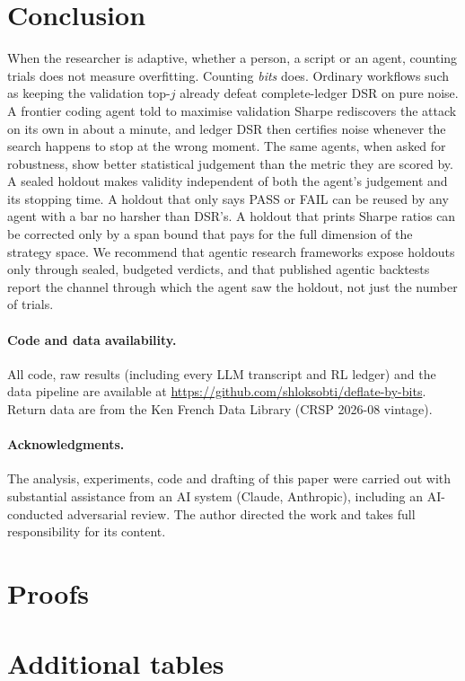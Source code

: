 \documentclass[11pt]{article}
\theoremstyle{definition}
\theoremstyle{remark}
\begin{document}
\section{Conclusion}
When the researcher is adaptive, whether a person, a script or an agent, counting trials does not measure overfitting. Counting \emph{bits} does. Ordinary workflows such as keeping the validation top-$j$ already defeat complete-ledger DSR on pure noise. A frontier coding agent told to maximise validation Sharpe rediscovers the attack on its own in about a minute, and ledger DSR then certifies noise whenever the search happens to stop at the wrong moment. The same agents, when asked for robustness, show better statistical judgement than the metric they are scored by. A sealed holdout makes validity independent of both the agent's judgement and its stopping time. A holdout that only says PASS or FAIL can be reused by any agent with a bar no harsher than DSR's. A holdout that prints Sharpe ratios can be corrected only by a span bound that pays for the full dimension of the strategy space. We recommend that agentic research frameworks expose holdouts only through sealed, budgeted verdicts, and that published agentic backtests report the channel through which the agent saw the holdout, not just the number of trials.

\paragraph{Code and data availability.} All code, raw results (including every LLM transcript and RL ledger) and the data pipeline are available at \url{https://github.com/shloksobti/deflate-by-bits}. Return data are from the Ken French Data Library (CRSP 2026-08 vintage).

\paragraph{Acknowledgments.} The analysis, experiments, code and drafting of this paper were carried out with substantial assistance from an AI system (Claude, Anthropic), including an AI-conducted adversarial review. The author directed the work and takes full responsibility for its content.




\appendix
\section{Proofs}\label{app:proofs}




\section{Additional tables}

\end{document}
